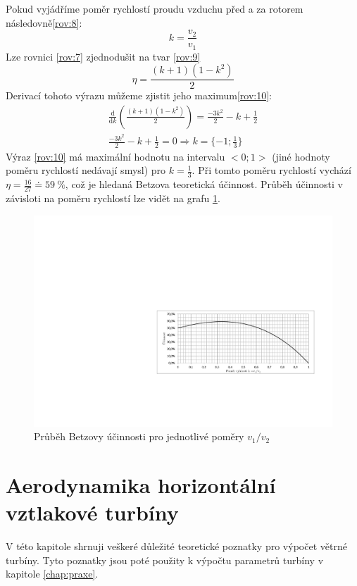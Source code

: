 	Pokud vyjádříme poměr rychlostí proudu vzduchu před a za rotorem následovně\eqref{rov:8}\cite{Rychetnik:Motory}:
	\begin{equation}
		\label{rov:8}
		k= \frac{v_2}{v_1}
	\end{equation}
	Lze rovnici \eqref{rov:7} zjednodušit na tvar \eqref{rov:9}
	\begin{equation}
		\label{rov:9}
		\eta = \frac{(k+1)(1-k^2)}{2}
	\end{equation}
	Derivací tohoto výrazu můžeme zjistit jeho maximum\eqref{rov:10}:
	\begin{eqnarray}					\label{rov:10}
		\frac{\mathrm{d}}{\mathrm{d}k}(\frac{(k+1)(1-k^2)}{2})=\frac{-3k^2}{2}-k+\frac{1}{2} \nonumber \\
		\frac{-3k^2}{2}-k+\frac{1}{2}=0 \Rightarrow k=\{-1;\frac{1}{3}\}
	\end{eqnarray}
	Výraz \ref{rov:10} má maximální hodnotu na intervalu $<0;1>$ (jiné hodnoty poměru rychlostí nedávají smysl) pro $k=\frac{1}{3}$. Při tomto poměru rychlostí vychází $\eta =\frac{16}{27}\doteq 59~\%$, což je hledaná Betzova teoretická účinnost. Průběh účinnosti v závisloti na poměru rychlostí lze vidět na grafu \ref{graf.ucinnost}.
	\begin{figure}[H]
		\centering
			\includegraphics[]{obrazky/grafy/ucinnost}
		\caption{Průběh Betzovy účinnosti pro jednotlivé poměry $v_1/v_2$}
		\label{graf.ucinnost}
	  \end{figure}
	  
	\section {Aerodynamika horizontální vztlakové turbíny}
	V této kapitole shrnuji veškeré důležité teoretické poznatky pro výpočet větrné turbíny. Tyto poznatky jsou poté použity k výpočtu parametrů turbíny v kapitole \ref{chap:praxe}.
	
